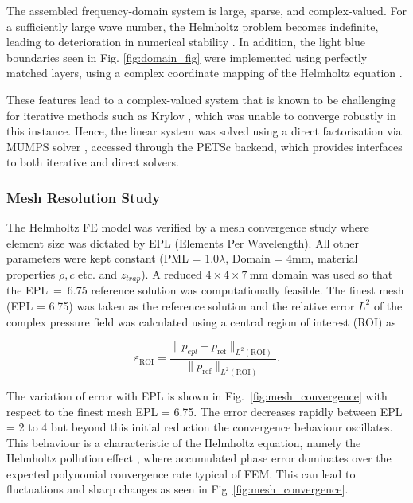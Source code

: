 \documentclass[11pt,a4paper]{article}
\begin{document}
\noindent The assembled frequency-domain system is large, sparse, and complex-valued. 
For a sufficiently large wave number, the Helmholtz  problem becomes indefinite, leading to deterioration in numerical stability \cite{ihlenburg1998finite}. In addition, the light blue boundaries seen in Fig. \ref{fig:domain_fig} were implemented using perfectly matched layers, using a complex coordinate mapping of the Helmholtz equation \cite{cimpeanu2015pml, berenger1994pml}. 

These features lead to a complex-valued system that is known to be challenging for iterative methods such as Krylov \cite{ernst2012helmholtz, ihlenburg1998finite}, which was unable to converge robustly in this instance. Hence, the linear system was solved using a direct factorisation via MUMPS solver \cite{mumps_userguide}, accessed through the PETSc backend, which provides interfaces to both iterative and direct solvers. 
\\

\subsubsection{Mesh Resolution Study}
\label{subsubsection:mesh-convergence}

The Helmholtz FE model was verified by a mesh convergence study where element size was dictated by $\mathrm{EPL}$ (Elements Per Wavelength). All other parameters were kept constant (PML = 1.0$\lambda$, Domain = 4mm, material properties $\rho, c$ etc. and $z_{trap}$). A reduced $4\times4\times7~\mathrm{mm}$ domain was used so that the EPL~=~6.75 reference solution was computationally feasible. The finest mesh (EPL = 6.75) was taken as the reference solution and the relative error $L^2$ of the complex pressure field was calculated using a central region of interest (ROI) as

\begin{equation}
\varepsilon_{\mathrm{ROI}}=
\frac{\|p_{epl}-p_{\mathrm{ref}}\|_{L^2(\mathrm{ROI})}}
{\|p_{\mathrm{ref}}\|_{L^2(\mathrm{ROI})}}.
\end{equation}

\noindent The variation of error with EPL is shown in Fig.~\ref{fig:mesh_convergence} with respect to the finest mesh EPL = 6.75. The error decreases rapidly between EPL = 2 to 4 but beyond this initial reduction the convergence behaviour oscillates. This behaviour is a characteristic of the Helmholtz equation, namely the Helmholtz pollution effect \cite{babuska1997pollution}, where accumulated phase error dominates over the expected polynomial convergence rate typical of FEM. This can lead to fluctuations and sharp changes as seen in Fig~\ref{fig:mesh_convergence}. 
\end{document}
